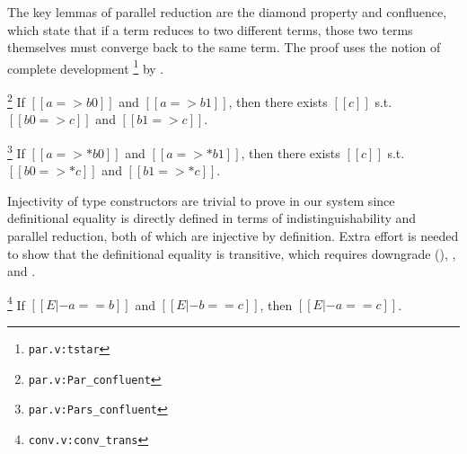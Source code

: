 \documentclass[acmsmall, screen=true, nonacm=true,
  review=\ifpublic false\else true\fi,
  anonymous=\ifanonymous true\else false\fi
]{acmart}
\makeatletter
\newcommand{\ie}{\textit{i.e.}\@\xspace}
\newcommand{\suppl}[3]{{\scriptsize\texttt{#2:#3}}}
\newlength{\punctwidth}
\newcommand{\stack}[1]{%
  \settowidth{\punctwidth}{#1}%
  \hspace*{-\the\punctwidth}%
}
\makeatother
\begin{document}
The key lemmas of parallel reduction are the diamond property and confluence,
which state that if a term reduces to two different terms,
those two terms themselves must converge back to the same term.
The proof uses the notion of complete development%
\footnote{\suppl{theories}{par.v}{tstar}}
by \citet{takahashi:par}.

\begin{lemma}[Diamond]
  \stack{.~}\footnote{\suppl{theories}{par.v}{Par\_confluent}}
  \label{lem:diamond}
  If $[[a => b0]]$ and $[[a => b1]]$, then
  there exists $[[c]]$ s.t. $[[b0 => c]]$ and $[[b1 => c]]$.
\end{lemma}

\begin{lemma}[Confluence]
  \stack{.~}\footnote{\suppl{theories}{par.v}{Pars\_confluent}}
  \label{lem:confluence}
  If $[[a =>* b0]]$ and $[[a =>* b1]]$, then
  there exists $[[c]]$ s.t. $[[b0 =>* c]]$ and $[[b1 =>* c]]$.
\end{lemma}

Injectivity of type constructors are trivial to prove in our system since
definitional equality is directly defined in terms of
indistinguishability and parallel reduction, both of which are
injective by definition. Extra effort is needed to show
that the definitional equality is transitive, which requires
downgrade (),
, and .

\begin{lemma}
  \stack{.~}\footnote{\suppl{theories}{conv.v}{conv\_trans}}
  If $[[E |- a == b]]$ and $[[E |- b == c]]$, then $[[E |- a == c]]$.
\end{lemma}



\end{document}
